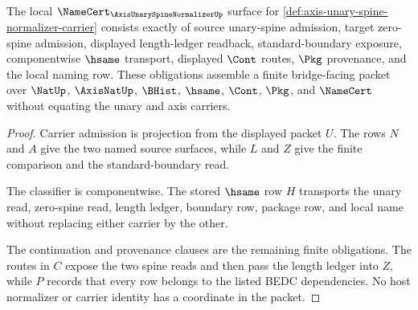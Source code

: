 \begin{theorem}
\label{thm:axis-unary-spine-normalizer-namecert-obligations}
The local $\NameCert_{\AxisUnarySpineNormalizerUp}$ surface for \autoref{def:axis-unary-spine-normalizer-carrier} consists exactly of source unary-spine admission, target zero-spine admission, displayed length-ledger readback, standard-boundary exposure, componentwise $\hsame$ transport, displayed $\Cont$ routes, $\Pkg$ provenance, and the local naming row. These obligations assemble a finite bridge-facing packet over $\NatUp$, $\AxisNatUp$, $\BHist$, $\hsame$, $\Cont$, $\Pkg$, and $\NameCert$ without equating the unary and axis carriers.
\end{theorem}
\begin{proof}
Carrier admission is projection from the displayed packet $U$. The rows $N$ and $A$ give the two named source surfaces, while $L$ and $Z$ give the finite comparison and the standard-boundary read.

The classifier is componentwise. The stored $\hsame$ row $H$ transports the unary read, zero-spine read, length ledger, boundary row, package row, and local name without replacing either carrier by the other.

The continuation and provenance clauses are the remaining finite obligations. The routes in $C$ expose the two spine reads and then pass the length ledger into $Z$, while $P$ records that every row belongs to the listed BEDC dependencies. No host normalizer or carrier identity has a coordinate in the packet.
\end{proof}

